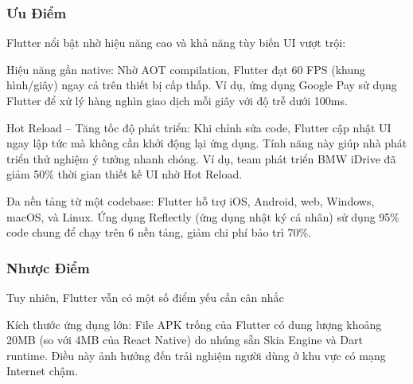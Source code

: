   \subsubsection{Ưu Điểm}
  \begin{flushleft}
    \hspace*{0.8cm}Flutter nổi bật nhờ hiệu năng cao và khả năng tùy biến UI vượt trội:
  \end{flushleft}

  \begin{flushleft}
    \hspace*{0.8cm}Hiệu năng gần native: Nhờ AOT compilation, Flutter đạt 60 FPS (khung hình/giây) ngay cả trên thiết bị cấp thấp. Ví dụ, ứng dụng Google Pay sử dụng Flutter để xử lý hàng nghìn giao dịch mỗi giây với độ trễ dưới 100ms.
  \end{flushleft}

  \begin{flushleft}
    \hspace*{0.8cm}Hot Reload – Tăng tốc độ phát triển: Khi chỉnh sửa code, Flutter cập nhật UI ngay lập tức mà không cần khởi động lại ứng dụng. Tính năng này giúp nhà phát triển thử nghiệm ý tưởng nhanh chóng. Ví dụ, team phát triển BMW iDrive đã giảm 50\% thời gian thiết kế UI nhờ Hot Reload.
  \end{flushleft}

  \begin{flushleft}
    \hspace*{0.8cm}Đa nền tảng từ một codebase: Flutter hỗ trợ iOS, Android, web, Windows, macOS, và Linux. Ứng dụng Reflectly (ứng dụng nhật ký cá nhân) sử dụng 95\% code chung để chạy trên 6 nền tảng, giảm chi phí bảo trì 70\%.
  \end{flushleft}
  \subsubsection{Nhược Điểm}
  \begin{flushleft}
    \hspace*{0.8cm}Tuy nhiên, Flutter vẫn có một số điểm yếu cần cân nhắc
  \end{flushleft}

  \begin{flushleft}
    \hspace*{0.8cm}Kích thước ứng dụng lớn: File APK trống của Flutter có dung lượng khoảng 20MB (so với 4MB của React Native) do nhúng sẵn Skia Engine và Dart runtime. Điều này ảnh hưởng đến trải nghiệm người dùng ở khu vực có mạng Internet chậm.
  \end{flushleft}

